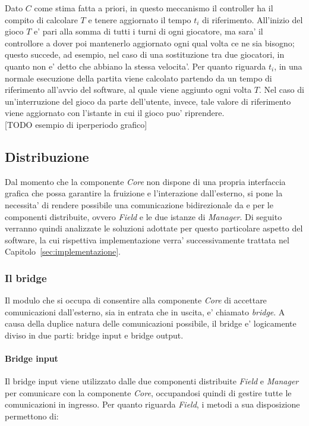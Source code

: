 Dato $C$ come stima fatta a priori, in questo meccanismo il controller ha il compito di calcolare $T$ e tenere aggiornato il tempo $t_i$ di riferimento. All'inizio del gioco $T$ e' pari alla somma di tutti i turni di ogni giocatore, ma sara' il controllore a dover poi mantenerlo aggiornato ogni qual volta ce ne sia bisogno; questo succede, ad esempio, nel caso di una sostituzione tra due giocatori, in quanto non e' detto che abbiano la stessa velocita'. Per quanto riguarda $t_i$, in una normale esecuzione della partita viene calcolato partendo da un tempo di riferimento all'avvio del software, al quale viene aggiunto ogni volta $T$. Nel caso di un'interruzione del gioco da parte dell'utente, invece, tale valore di riferimento viene aggiornato con l'istante in cui il gioco puo' riprendere.\\

[TODO esempio di iperperiodo grafico]

\subsection{Distribuzione}
\label{sec:analisi_distribuzione}

Dal momento che la componente \textit{Core} non dispone di una propria interfaccia grafica che possa garantire la fruizione e l'interazione dall'esterno, si pone la necessita' di rendere possibile una comunicazione bidirezionale da e per le componenti distribuite, ovvero \textit{Field} e le due istanze di \textit{Manager}. Di seguito verranno quindi analizzate le soluzioni adottate per questo particolare aspetto del software, la cui rispettiva implementazione verra' successivamente trattata nel Capitolo~\ref{sec:implementazione}.

\subsubsection{Il bridge}
\label{sec:analisi_distribuzione_bridge}

Il modulo che si occupa di consentire alla componente \textit{Core} di accettare comunicazioni dall'esterno, sia in entrata che in uscita, e' chiamato \textit{bridge}. A causa della duplice natura delle comunicazioni possibile, il bridge e' logicamente diviso in due parti: bridge input e bridge output.

\paragraph{Bridge input}\label{sec:analisi_distribuzione_bridge_input} Il bridge input viene utilizzato dalle due componenti distribuite \textit{Field} e \textit{Manager} per comunicare con la componente \textit{Core}, occupandosi quindi di gestire tutte le comunicazioni in ingresso. Per quanto riguarda \textit{Field}, i metodi a sua disposizione permettono di:

